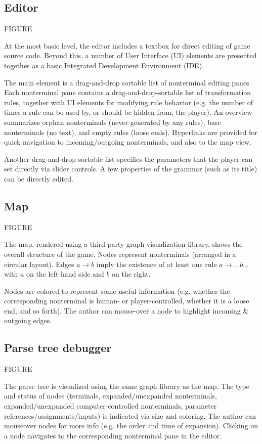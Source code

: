 \documentclass{acm_proc_article-sp}
\begin{document}
\subsection{Editor}

FIGURE

At the most basic level, the editor includes a textbox for direct editing of game source code.
Beyond this, a number of User Interface (UI)
elements are presented together as a basic Integrated Development Environment (IDE).

The main element is a drag-and-drop sortable list of nonterminal editing panes.
Each nonterminal pane contains a drag-and-drop-sortable list of transformation rules,
together with UI elements for modifying rule behavior (e.g. the number of times
a rule can be used by, or should be hidden from, the player).
An overview summarizes orphan nonterminals (never generated by any rules),
bare nonterminals (no text), and empty rules (loose ends).
Hyperlinks are provided for quick navigation to incoming/outgoing nonterminals,
and also to the map view.

Another drag-and-drop sortable list specifies the parameters that the player
can set directly via slider controls.
A few properties of the grammar (such as its title) can be directly edited.

\subsection{Map}

FIGURE

The map, rendered using a third-party graph visualization library,
shows the overall structure of the game.
Nodes represent nonterminals (arranged in a circular layout).
Edges $a \to b$ imply the existence of at least one rule $a \to \ldots b \ldots$
with $a$ on the left-hand side and $b$ on the right.

Nodes are colored to represent some useful information
(e.g. whether the corresponding nonterminal is human- or player-controlled,
whether it is a loose end, and so forth).
The author can mouse-over a node to highlight incoming \& outgoing edges.

\subsection{Parse tree debugger}

FIGURE

The parse tree is visualized using the same graph library as the map.
The type and status of nodes (terminals, expanded/unexpanded nonterminals, expanded/unexpanded computer-controlled nonterminals, parameter references/assignments/inputs) is indicated via size and coloring.
The author can mouseover nodes for more info (e.g. the order and time of expansion).
Clicking on a node navigates to the corresponding nonterminal pane in the editor.
\end{document}
